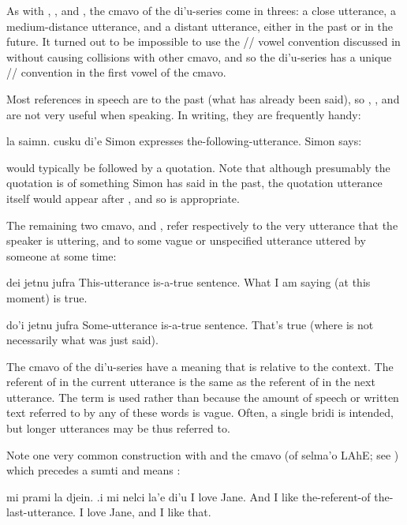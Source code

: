 As with , , and , the cmavo of the
    di'u-series come in threes: a close utterance, a
    medium-distance utterance, and a distant utterance, either in
    the past or in the future. It turned out to be impossible to
    use the // vowel convention discussed in  without causing collisions with other
    cmavo, and so the di'u-series has a unique //
    convention in the first vowel of the cmavo.

Most references in speech are to the past (what has already
    been said), so , , and  are not very
    useful when speaking. In writing, they are frequently
    handy:
\begin{example}
la saimn. cusku di'e\n
Simon expresses the-following-utterance.\n
Simon says:
\end{example}

 would typically be followed by
    a quotation. Note that although presumably the quotation is of
    something Simon has said in the past, the quotation utterance
    itself would appear after , and
    so  is appropriate. 

The remaining two cmavo,  and , refer
    respectively to the very utterance that the speaker is
    uttering, and to some vague or unspecified utterance uttered by
    someone at some time:
\begin{example}
dei jetnu jufra\n
This-utterance is-a-true sentence.\n
What I am saying (at this moment) is true.
\end{example}

\begin{example}
do'i jetnu jufra\n
Some-utterance is-a-true sentence.\n
That's true (where  is not necessarily what\n
\T	was just said).
\end{example}

The cmavo of the di'u-series have a meaning that is relative to
    the context. The referent of  in the current utterance
    is the same as the referent of  in the next utterance.
    The term  is used rather than  because
    the amount of speech or written text referred to by any of
    these words is vague. Often, a single bridi is intended, but
    longer utterances may be thus referred to. 

Note one very common construction with  and the
    cmavo  (of selma'o LAhE; see ) which precedes a sumti and
    means :
\begin{example}
mi prami la djein.\n
\T	.i mi nelci la'e di'u\n
I love Jane.\n
\T	And I like the-referent-of the-last-utterance.\n
I love Jane, and I like that.
\end{example}

